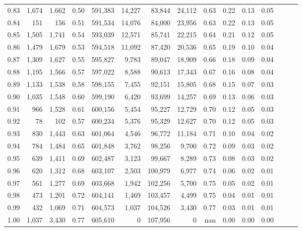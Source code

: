 \begin{tabular}{rrrrrrrrrrrrrrr}
0.83 &   1,674 &  1,662 &  0.50 &  591,383 &   14,227 &   83,844 &   24,112 &  0.63 &  0.22 &  0.13 &      0.05 \\
0.84 &     151 &    156 &  0.51 &  591,534 &   14,076 &   84,000 &   23,956 &  0.63 &  0.22 &  0.13 &      0.05 \\
0.85 &   1,505 &  1,741 &  0.54 &  593,039 &   12,571 &   85,741 &   22,215 &  0.64 &  0.21 &  0.12 &      0.05 \\
0.86 &   1,479 &  1,679 &  0.53 &  594,518 &   11,092 &   87,420 &   20,536 &  0.65 &  0.19 &  0.10 &      0.04 \\
0.87 &   1,309 &  1,627 &  0.55 &  595,827 &    9,783 &   89,047 &   18,909 &  0.66 &  0.18 &  0.09 &      0.04 \\
0.88 &   1,195 &  1,566 &  0.57 &  597,022 &    8,588 &   90,613 &   17,343 &  0.67 &  0.16 &  0.08 &      0.04 \\
0.89 &   1,133 &  1,538 &  0.58 &  598,155 &    7,455 &   92,151 &   15,805 &  0.68 &  0.15 &  0.07 &      0.03 \\
0.90 &   1,035 &  1,548 &  0.60 &  599,190 &    6,420 &   93,699 &   14,257 &  0.69 &  0.13 &  0.06 &      0.03 \\
0.91 &     966 &  1,528 &  0.61 &  600,156 &    5,454 &   95,227 &   12,729 &  0.70 &  0.12 &  0.05 &      0.03 \\
0.92 &      78 &    102 &  0.57 &  600,234 &    5,376 &   95,329 &   12,627 &  0.70 &  0.12 &  0.05 &      0.03 \\
0.93 &     830 &  1,443 &  0.63 &  601,064 &    4,546 &   96,772 &   11,184 &  0.71 &  0.10 &  0.04 &      0.02 \\
0.94 &     784 &  1,484 &  0.65 &  601,848 &    3,762 &   98,256 &    9,700 &  0.72 &  0.09 &  0.03 &      0.02 \\
0.95 &     639 &  1,411 &  0.69 &  602,487 &    3,123 &   99,667 &    8,289 &  0.73 &  0.08 &  0.03 &      0.02 \\
0.96 &     620 &  1,312 &  0.68 &  603,107 &    2,503 &  100,979 &    6,977 &  0.74 &  0.06 &  0.02 &      0.01 \\
0.97 &     561 &  1,277 &  0.69 &  603,668 &    1,942 &  102,256 &    5,700 &  0.75 &  0.05 &  0.02 &      0.01 \\
0.98 &     473 &  1,201 &  0.72 &  604,141 &    1,469 &  103,457 &    4,499 &  0.75 &  0.04 &  0.01 &      0.01 \\
0.99 &     432 &  1,069 &  0.71 &  604,573 &    1,037 &  104,526 &    3,430 &  0.77 &  0.03 &  0.01 &      0.01 \\
1.00 &   1,037 &  3,430 &  0.77 &  605,610 &        0 &  107,956 &        0 &   nan &  0.00 &  0.00 &      0.00 \\
\bottomrule
\end{tabular}
